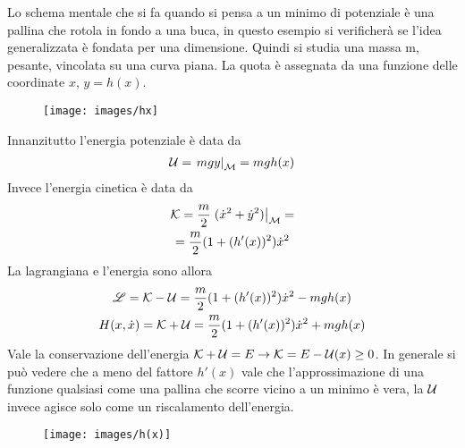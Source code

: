 \documentclass[Main.tex]{subfiles}
\begin{document}
\begin{tema}
	Lo schema mentale che si fa quando si pensa a un minimo di potenziale è una pallina che rotola in fondo a una buca, in questo esempio si verificherà se l'idea generalizzata è fondata per una dimensione. Quindi si studia una massa m, pesante, vincolata su una curva piana. La quota è assegnata da una funzione delle coordinate $x$, $y=h(x)$.
\begin{figure}[H]
    \centering
  \texttt{[image: images/hx]}
\end{figure}


Innanzitutto l'energia potenziale è data da
\begin{gather}
	\mathcal{U} = \left. mgy \right|_{\mathcal{M}} = mgh(x) 
\end{gather}
Invece l'energia cinetica è data da 
\begin{gather}
	\mathcal{K} = \frac{m}{2} \left. (\dot x^2 + \dot y^2) \right|_{\mathcal{M}} = \\
	= \frac{m}{2} ( 1+ (h'(x) )^2) \dot x^2
\end{gather}
La lagrangiana e l'energia sono allora 
\begin{gather}
	\mathscr{L} = \mathcal{K} -\mathcal{U} = \frac{m}{2} ( 1+ (h'(x))^2)\dot x^2 - mg h(x)\\
	H(x, \dot x) = \mathcal{K} + \mathcal{U} = \frac{m}{2} ( 1 + (h'(x))^2)\dot x^2 + mg h(x)
\end{gather}
Vale la conservazione dell'energia $\mathcal{K} +\mathcal{U}=E \rightarrow \mathcal{K} = E-\mathcal{U}(x)\geq 0$.
In generale si può vedere che a meno del fattore $h'(x)$ vale che l'approssimazione di una funzione qualsiasi come una pallina che scorre vicino a un minimo è vera, la $\mathcal{U}$ invece agisce solo come un riscalamento dell'energia.

\begin{figure}[H]
    \centering
  \texttt{[image: images/h(x)]}
\end{figure}


\end{tema}
\end{document}
